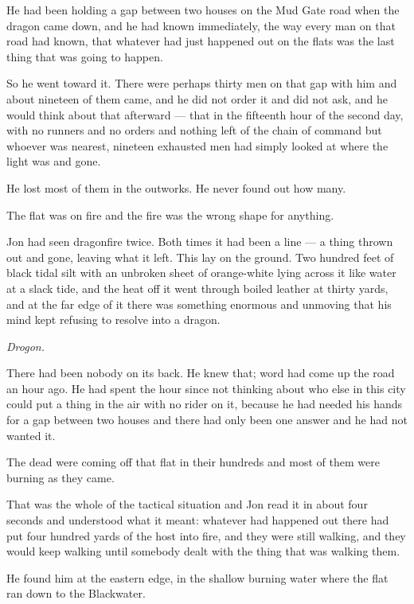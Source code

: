 He had been holding a gap between two houses on the Mud Gate road when the dragon came down, and he had known immediately, the way every man on that road had known, that whatever had just happened out on the flats was the last thing that was going to happen.

So he went toward it. There were perhaps thirty men on that gap with him and about nineteen of them came, and he did not order it and did not ask, and he would think about that afterward — that in the fifteenth hour of the second day, with no runners and no orders and nothing left of the chain of command but whoever was nearest, nineteen exhausted men had simply looked at where the light was and gone.

He lost most of them in the outworks. He never found out how many.

\sceneBreak

The flat was on fire and the fire was the wrong shape for anything.

Jon had seen dragonfire twice. Both times it had been a line — a thing thrown out and gone, leaving what it left. This lay on the ground. Two hundred feet of black tidal silt with an unbroken sheet of orange-white lying across it like water at a slack tide, and the heat off it went through boiled leather at thirty yards, and at the far edge of it there was something enormous and unmoving that his mind kept refusing to resolve into a dragon.

\textit{Drogon.}

There had been nobody on its back. He knew that; word had come up the road an hour ago. He had spent the hour since not thinking about who else in this city could put a thing in the air with no rider on it, because he had needed his hands for a gap between two houses and there had only been one answer and he had not wanted it.

The dead were coming off that flat in their hundreds and most of them were burning as they came.

That was the whole of the tactical situation and Jon read it in about four seconds and understood what it meant: whatever had happened out there had put four hundred yards of the host into fire, and they were still walking, and they would keep walking until somebody dealt with the thing that was walking them.

\sceneBreak

He found him at the eastern edge, in the shallow burning water where the flat ran down to the Blackwater.

